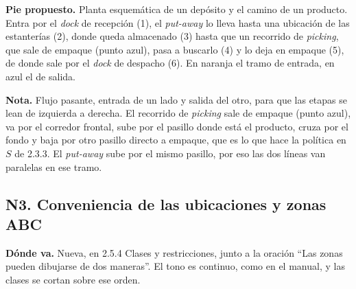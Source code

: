 \documentclass[a4paper,10pt]{article}
\newcommand{\donde}[1]{\par\noindent\textbf{Dónde va.} #1\par\smallskip}
\newcommand{\pie}[1]{\par\noindent\textbf{Pie propuesto.} #1\par\smallskip}
\newcommand{\nota}[1]{\par\noindent\textbf{Nota.} #1\par\smallskip}
\begin{document}
\pie{Planta esquemática de un depósito y el camino de un producto. Entra por el
\emph{dock} de recepción (1), el \emph{put-away} lo lleva hasta una ubicación
de las estanterías (2), donde queda almacenado (3) hasta que un recorrido de
\emph{picking}, que sale de empaque (punto azul), pasa a buscarlo (4) y lo deja
en empaque (5), de donde sale por el \emph{dock} de despacho (6). En naranja el
tramo de entrada, en azul el de salida.}

\nota{Flujo pasante, entrada de un lado y salida del otro, para que las etapas
se lean de izquierda a derecha. El recorrido de \emph{picking} sale de empaque
(punto azul), va por el corredor frontal, sube por el pasillo donde está el
producto, cruza por el fondo y baja por otro pasillo directo a empaque, que es
lo que hace la política en $S$ de 2.3.3. El \emph{put-away} sube por el mismo
pasillo, por eso las dos líneas van paralelas en ese tramo.}

\clearpage
\subsection{N3. Conveniencia de las ubicaciones y zonas ABC}

\donde{Nueva, en 2.5.4 Clases y restricciones, junto a la oración ``Las zonas
pueden dibujarse de dos maneras''. El tono es continuo, como en el manual, y
las clases se cortan sobre ese orden.}
\end{document}
